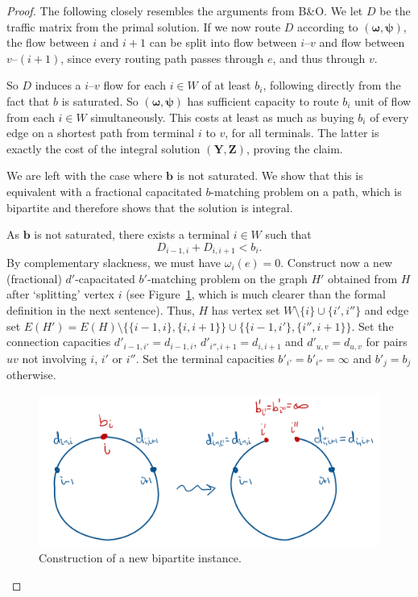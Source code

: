 \begin{proof}
    The following closely resembles the arguments from B\&O\@.
    We let $D$ be the traffic matrix from the primal solution.
    If we now route $D$ according to $(\boldsymbol \omega, \boldsymbol \psi)$, the flow between $i$ and $i+1$ can be split into flow between $i$--$v$ and flow between $v$--$(i+1)$, since every routing path passes through $e$, and thus through $v$.

    So $D$ induces a $i$--$v$ flow for each $i \in W$ of at least $b_i$, following directly from the fact that $b$ is saturated.
    So $(\boldsymbol \omega, \boldsymbol \psi)$ has sufficient capacity to route $b_i$ unit of flow from each $i \in W$ simultaneously.
    This costs at least as much as buying $b_i$ of every edge on a shortest path from terminal $i$ to $v$, for all terminals.
    The latter is exactly the cost of the integral solution $(\boldsymbol Y, \boldsymbol Z)$, proving the claim.

    We are left with the case where $\boldsymbol b$ is not saturated.
    We show that this is equivalent with a fractional capacitated $b$-matching problem on a path, which is bipartite and therefore shows that the solution is integral.

    As $\boldsymbol b$ is not saturated, there exists a terminal $i \in W$ such that
    \[
        D_{i-1,i} + D_{i,i+1} < b_i.
    \]
    By complementary slackness, we must have $\omega_i(e) = 0$.
    Construct now a new (fractional) $d'$-capacitated $b'$-matching problem on the graph $H'$ obtained from $H$ after `splitting' vertex $i$ (see Figure~\ref{fig:split}, which is much clearer than the formal definition in the next sentence).
    Thus, $H$ has vertex set $W\setminus \{i\} \cup \{i', i''\}$ and edge set $E(H') = E(H) \setminus \{ \{i-1,i\}, \{i, i+1\} \} \cup \{ \{i-1, i'\}, \{i'', i+1\} \}$.
    Set the connection capacities $d'_{i-1,i'} = d_{i-1,i}$, $d'_{i'',i+1} = d_{i,i+1}$ and $d'_{u,v} = d_{u,v}$ for pairs $uv$ not involving $i$, $i'$ or $i''$.
    Set the terminal capacities $b'_{i'} = b'_{i''} = \infty$ and $b'_j = b_j$ otherwise.

    \begin{figure}[h]
        \centering
        \includegraphics[width=.65\textwidth]{split}
        \caption{Construction of a new bipartite instance.} \label{fig:split}
    \end{figure}


\end{proof}
